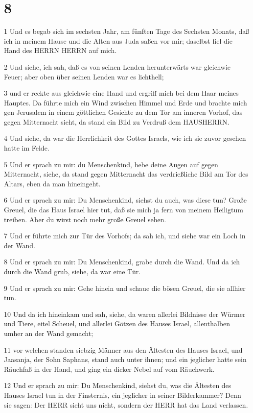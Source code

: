 \chapter{8}

\par 1 Und es begab sich im sechsten Jahr, am fünften Tage des Sechsten Monats, daß ich in meinem Hause und die Alten aus Juda saßen vor mir; daselbst fiel die Hand des HERRN HERRN auf mich.
\par 2 Und siehe, ich sah, daß es von seinen Lenden herunterwärts war gleichwie Feuer; aber oben über seinen Lenden war es lichthell;
\par 3 und er reckte aus gleichwie eine Hand und ergriff mich bei dem Haar meines Hauptes. Da führte mich ein Wind zwischen Himmel und Erde und brachte mich gen Jerusalem in einem göttlichen Gesichte zu dem Tor am inneren Vorhof, das gegen Mitternacht sieht, da stand ein Bild zu Verdruß dem HAUSHERRN.
\par 4 Und siehe, da war die Herrlichkeit des Gottes Israels, wie ich sie zuvor gesehen hatte im Felde.
\par 5 Und er sprach zu mir: du Menschenkind, hebe deine Augen auf gegen Mitternacht, siehe, da stand gegen Mitternacht das verdrießliche Bild am Tor des Altars, eben da man hineingeht.
\par 6 Und er sprach zu mir: Du Menschenkind, siehst du auch, was diese tun? Große Greuel, die das Haus Israel hier tut, daß sie mich ja fern von meinem Heiligtum treiben. Aber du wirst noch mehr große Greuel sehen.
\par 7 Und er führte mich zur Tür des Vorhofs; da sah ich, und siehe war ein Loch in der Wand.
\par 8 Und er sprach zu mir: Du Menschenkind, grabe durch die Wand. Und da ich durch die Wand grub, siehe, da war eine Tür.
\par 9 Und er sprach zu mir: Gehe hinein und schaue die bösen Greuel, die sie allhier tun.
\par 10 Und da ich hineinkam und sah, siehe, da waren allerlei Bildnisse der Würmer und Tiere, eitel Scheuel, und allerlei Götzen des Hauses Israel, allenthalben umher an der Wand gemacht;
\par 11 vor welchen standen siebzig Männer aus den Ältesten des Hauses Israel, und Jaasanja, der Sohn Saphans, stand auch unter ihnen; und ein jeglicher hatte sein Räuchfaß in der Hand, und ging ein dicker Nebel auf vom Räuchwerk.
\par 12 Und er sprach zu mir: Du Menschenkind, siehst du, was die Ältesten des Hauses Israel tun in der Finsternis, ein jeglicher in seiner Bilderkammer? Denn sie sagen: Der HERR sieht uns nicht, sondern der HERR hat das Land verlassen.
